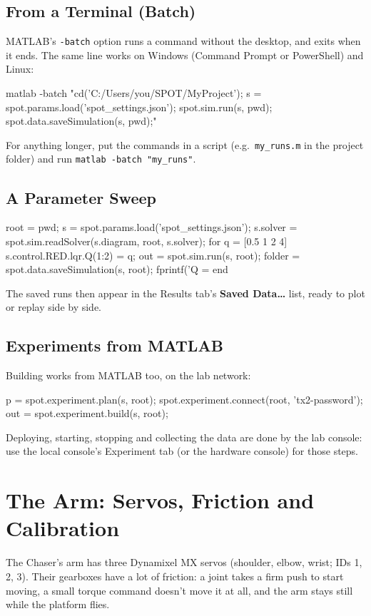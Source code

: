 \documentclass[11pt,a4paper]{article}
\newcommand{\ui}[1]{\textsf{\textbf{#1}}}
\newcommand{\pth}[1]{\texttt{#1}}
\newcommand{\fn}[1]{\texttt{#1}}
\begin{document}
\subsection{From a Terminal (Batch)}
MATLAB's \fn{-batch} option runs a command without the desktop, and exits when it ends. The same line works on Windows
(Command Prompt or PowerShell) and Linux:
\begin{shell}
matlab -batch "cd('C:/Users/you/SPOT/MyProject'); s = spot.params.load('spot_settings.json'); spot.sim.run(s, pwd); spot.data.saveSimulation(s, pwd);"
\end{shell}
For anything longer, put the commands in a script (e.g.\ \pth{my\_runs.m} in the project folder) and run
\pth{matlab -batch "my\_runs"}.

\subsection{A Parameter Sweep}
\begin{matlab}
root = pwd;
s = spot.params.load('spot_settings.json');
s.solver = spot.sim.readSolver(s.diagram, root, s.solver);
for q = [0.5 1 2 4]
    s.control.RED.lqr.Q(1:2) = q;               %
    out = spot.sim.run(s, root);
    folder = spot.data.saveSimulation(s, root); %
    fprintf('Q = %
end
\end{matlab}
The saved runs then appear in the Results tab's \ui{Saved Data\ldots} list, ready to plot or replay side by side.

\subsection{Experiments from MATLAB}
Building works from MATLAB too, on the lab network:
\begin{matlab}
p = spot.experiment.plan(s, root);              %
spot.experiment.connect(root, 'tx2-password');  %
out = spot.experiment.build(s, root);           %
\end{matlab}
Deploying, starting, stopping and collecting the data are done by the lab console: use the local console's
Experiment tab (or the hardware console) for those steps.

\section{The Arm: Servos, Friction and Calibration}\label{sec:arm}
The Chaser's arm has three Dynamixel MX servos (shoulder, elbow, wrist; IDs 1, 2, 3). Their gearboxes have a lot of
friction: a joint takes a firm push to start moving, a small torque command doesn't move it at all, and the arm stays
still while the platform flies.
\end{document}
